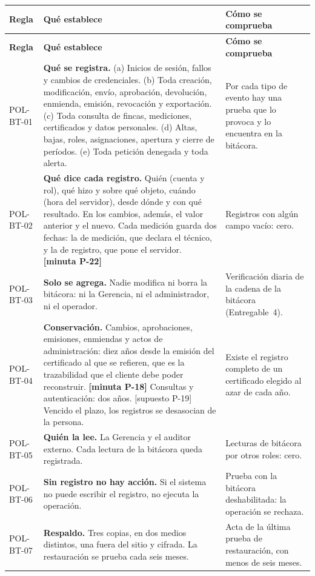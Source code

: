 \documentclass[11pt,letterpaper]{article}
\newcommand{\cab}[1]{\textbf{\rmfamily #1}}
\newcommand{\resp}[1]{\textrm{\footnotesize\bfseries [minuta #1]}}
\newcommand{\supu}[1]{\textrm{\footnotesize [supuesto #1]}}
\begin{document}
{\small
\renewcommand{\arraystretch}{1.14}
\begin{longtable}{@{}L{1.7cm} L{9.2cm} L{4.8cm}@{}}
\toprule
\cab{Regla} & \cab{Qué establece} & \cab{Cómo se comprueba} \\
\midrule
\endfirsthead
\toprule
\cab{Regla} & \cab{Qué establece} & \cab{Cómo se comprueba} \\
\midrule
\endhead
\bottomrule
\endfoot
POL-BT-01 & \textbf{Qué se registra.} (a) Inicios de sesión, fallos y cambios de credenciales. (b) Toda creación, modificación, envío, aprobación, devolución, enmienda, emisión, revocación y exportación. (c) Toda consulta de fincas, mediciones, certificados y datos personales. (d) Altas, bajas, roles, asignaciones, apertura y cierre de períodos. (e) Toda petición denegada y toda alerta. & Por cada tipo de evento hay una prueba que lo provoca y lo encuentra en la bitácora. \\
POL-BT-02 & \textbf{Qué dice cada registro.} Quién (cuenta y rol), qué hizo y sobre qué objeto, cuándo (hora del servidor), desde dónde y con qué resultado. En los cambios, además, el valor anterior y el nuevo. Cada medición guarda dos fechas: la de medición, que declara el técnico, y la de registro, que pone el servidor. \resp{P-22} & Registros con algún campo vacío: cero. \\
POL-BT-03 & \textbf{Solo se agrega.} Nadie modifica ni borra la bitácora: ni la Gerencia, ni el administrador, ni el operador. & Verificación diaria de la cadena de la bitácora (Entregable~4). \\
POL-BT-04 & \textbf{Conservación.} Cambios, aprobaciones, emisiones, enmiendas y actos de administración: diez años desde la emisión del certificado al que se refieren, que es la trazabilidad que el cliente debe poder reconstruir. \resp{P-18} Consultas y autenticación: dos años. \supu{P-19} Vencido el plazo, los registros se desasocian de la persona. & Existe el registro completo de un certificado elegido al azar de cada año. \\
POL-BT-05 & \textbf{Quién la lee.} La Gerencia y el auditor externo. Cada lectura de la bitácora queda registrada. & Lecturas de bitácora por otros roles: cero. \\
POL-BT-06 & \textbf{Sin registro no hay acción.} Si el sistema no puede escribir el registro, no ejecuta la operación. & Prueba con la bitácora deshabilitada: la operación se rechaza. \\
POL-BT-07 & \textbf{Respaldo.} Tres copias, en dos medios distintos, una fuera del sitio y cifrada. La restauración se prueba cada seis meses. & Acta de la última prueba de restauración, con menos de seis meses. \\
\end{longtable}
}
\end{document}
